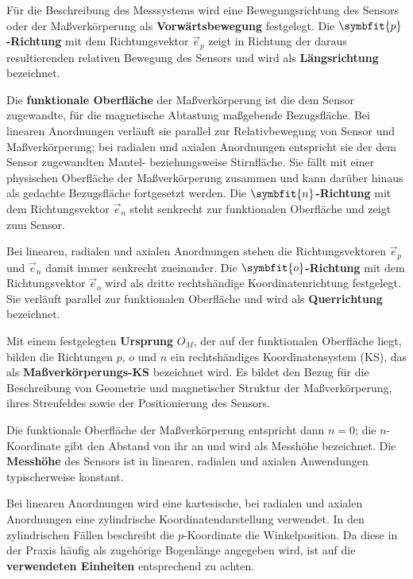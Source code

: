 \documentclass[
  ngerman,
  a4paper,
  twoside]{scrbook}
\begin{document}
Für die Beschreibung des Messsystems wird eine Bewegungsrichtung des
Sensors oder der Maßverkörperung als \textbf{Vorwärtsbewegung}
festgelegt. Die \(\symbfit{p}\)\textbf{-Richtung} mit dem
Richtungsvektor \(\vec{e}_p\) zeigt in Richtung der daraus
resultierenden relativen Bewegung des Sensors und wird als
\textbf{Längsrichtung} bezeichnet.

Die \textbf{funktionale Oberfläche} der Maßverkörperung ist die dem
Sensor zugewandte, für die magnetische Abtastung maßgebende
Bezugsfläche. Bei linearen Anordnungen verläuft sie parallel zur
Relativbewegung von Sensor und Maßverkörperung; bei radialen und axialen
Anordnungen entspricht sie der dem Sensor zugewandten Mantel-
beziehungsweise Stirnfläche. Sie fällt mit einer physischen Oberfläche
der Maßverkörperung zusammen und kann darüber hinaus als gedachte
Bezugsfläche fortgesetzt werden. Die \(\symbfit{n}\)\textbf{-Richtung}
mit dem Richtungsvektor \(\vec{e}_n\) steht senkrecht zur funktionalen
Oberfläche und zeigt zum Sensor.

Bei linearen, radialen und axialen Anordnungen stehen die
Richtungsvektoren \(\vec{e}_p\) und \(\vec{e}_n\) damit immer senkrecht
zueinander. Die \(\symbfit{o}\)\textbf{-Richtung} mit dem
Richtungsvektor \(\vec{e}_o\) wird als dritte rechtshändige
Koordinatenrichtung festgelegt. Sie verläuft parallel zur funktionalen
Oberfläche und wird als \textbf{Querrichtung} bezeichnet.

Mit einem festgelegten \textbf{Ursprung} \(O_M\), der auf der
funktionalen Oberfläche liegt, bilden die Richtungen \(p\), \(o\) und
\(n\) ein rechtshändiges Koordinatensystem (KS), das als
\textbf{Maßverkörperungs-KS} bezeichnet wird. Es bildet den Bezug für
die Beschreibung von Geometrie und magnetischer Struktur der
Maßverkörperung, ihres Streufeldes sowie der Positionierung des Sensors.

Die funktionale Oberfläche der Maßverkörperung entspricht dann \(n=0\);
die \(n\)-Koordinate gibt den Abstand von ihr an und wird als Messhöhe
bezeichnet. Die \textbf{Messhöhe} des Sensors ist in linearen, radialen
und axialen Anwendungen typischerweise konstant.

Bei linearen Anordnungen wird eine kartesische, bei radialen und axialen
Anordnungen eine zylindrische Koordinatendarstellung verwendet. In den
zylindrischen Fällen beschreibt die \(p\)-Koordinate die Winkelposition.
Da diese in der Praxis häufig als zugehörige Bogenlänge angegeben wird,
ist auf die \textbf{verwendeten Einheiten} entsprechend zu achten.
\end{document}
